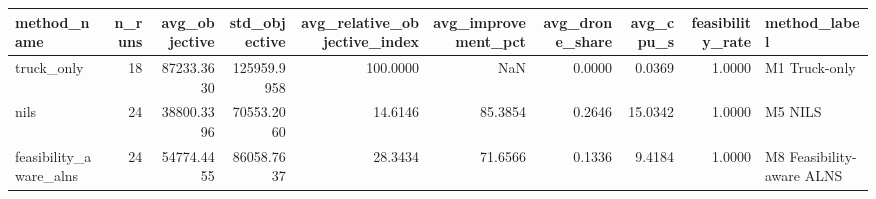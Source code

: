 \begin{tabular}{lrrrrrrrrl}
\toprule
method_name & n_runs & avg_objective & std_objective & avg_relative_objective_index & avg_improvement_pct & avg_drone_share & avg_cpu_s & feasibility_rate & method_label \\
\midrule
truck_only & 18 & 87233.3630 & 125959.9958 & 100.0000 & NaN & 0.0000 & 0.0369 & 1.0000 & M1 Truck-only \\
nils & 24 & 38800.3396 & 70553.2060 & 14.6146 & 85.3854 & 0.2646 & 15.0342 & 1.0000 & M5 NILS \\
feasibility_aware_alns & 24 & 54774.4455 & 86058.7637 & 28.3434 & 71.6566 & 0.1336 & 9.4184 & 1.0000 & M8 Feasibility-aware ALNS \\
\bottomrule
\end{tabular}
